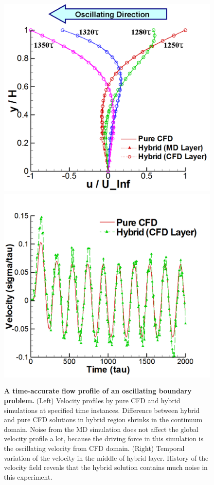\documentclass[preprint,12pt]{elsarticle}
\begin{document}

\begin{figure}
\centering
\includegraphics[width=0.6\linewidth]{Stokes_Sol_Profile.pdf}
\hskip 1cm
\includegraphics[width=0.6\linewidth]{Stokes_Temporal_Profile.pdf}
\vskip-0.2cm
\caption{\small {\bf A time-accurate flow profile of an oscillating boundary problem.} (Left) Velocity profiles by pure CFD and hybrid simulations at specified time instances. Difference between hybrid and pure CFD solutions in hybrid region shrinks in the continuum domain. Noise from the MD simulation does not affect the global velocity profile a lot, because the driving force in this simulation is the oscillating velocity from CFD domain. (Right) Temporal variation of the velocity in the middle of hybrid layer. History of the velocity field reveals that the hybrid solution contains much noise in this experiment.}
\label{Stokes_Sol}
\end{figure}
\end{document}
